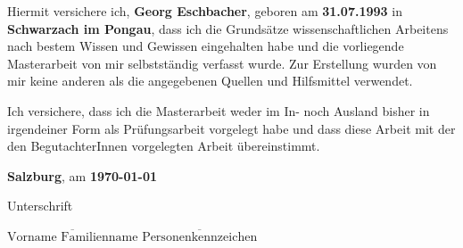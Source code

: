 
Hiermit versichere ich, \textbf{Georg Eschbacher}, geboren am \textbf{31.07.1993} in \textbf{Schwarzach im Pongau}, dass ich die Grundsätze wissenschaftlichen Arbeitens nach bestem Wissen und Gewissen eingehalten habe und die vorliegende Masterarbeit von mir selbstständig verfasst wurde. Zur Erstellung wurden von mir keine anderen als die angegebenen Quellen und Hilfsmittel verwendet. 

Ich versichere, dass ich die Masterarbeit weder im In- noch Ausland bisher in irgendeiner Form als Prüfungsarbeit vorgelegt habe und dass diese Arbeit mit der den BegutachterInnen vorgelegten Arbeit übereinstimmt.


\vspace*{3cm}

\textbf{Salzburg}, am \textbf{\today}


\hfill


Unterschrift

\vspace*{1cm}

\hfill \imatrikel\hspace*{1cm}\newline
$\overline{\text{Vorname Familienname}}$ \hfill	$\overline{\text{Personenkennzeichen}}$